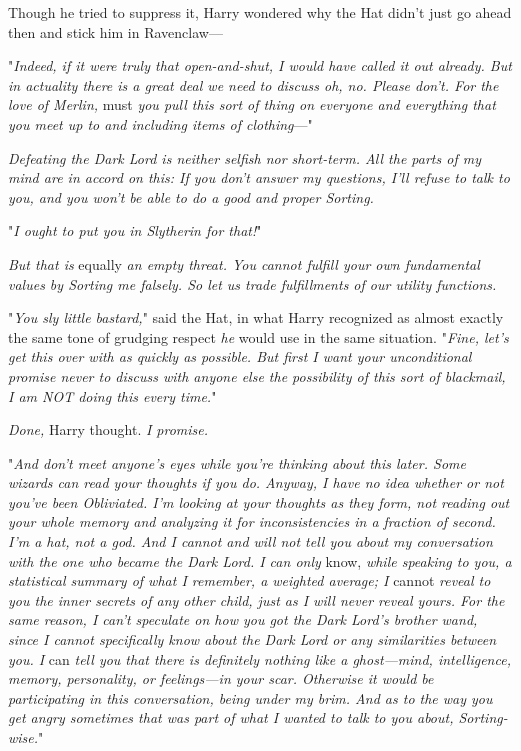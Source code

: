 Though he tried to suppress it, Harry wondered why the Hat didn't just go ahead
then and stick him in Ravenclaw---

"\emph{Indeed, if it were truly that open-and-shut, I would have called it out
already. But in actuality there is a great deal we need to discuss{\el} oh,
no. Please don't. For the love of Merlin,} must \emph{you pull this sort of
thing on everyone and everything that you meet up to and including items of
clothing}\mbox{---}"

\emph{Defeating the Dark Lord is neither selfish nor short-term. All the parts
of my mind are in accord on this: If you don't answer my questions, I'll refuse
to talk to you, and you won't be able to do a good and proper Sorting.}

"\emph{I ought to put you in Slytherin for that!}"

\emph{But that is} equally \emph{an empty threat. You cannot fulfill your own
fundamental values by Sorting me falsely. So let us trade fulfillments of our
utility functions.}

"\emph{You sly little bastard,}" said the Hat, in what Harry recognized as
almost exactly the same tone of grudging respect \emph{he} would use in the
same situation. "\emph{Fine, let's get this over with as quickly as possible.
But first I want your unconditional promise never to discuss with anyone else
the possibility of this sort of blackmail, I am NOT doing this every time.}"

\emph{Done,} Harry thought. \emph{I promise.}

"\emph{And don't meet anyone's eyes while you're thinking about this later.
Some wizards can read your thoughts if you do. Anyway, I have no idea whether
or not you've been Obliviated. I'm looking at your thoughts as they form, not
reading out your whole memory and analyzing it for inconsistencies in a
fraction of second. I'm a hat, not a god. And I cannot and will not tell you
about my conversation with the one who became the Dark Lord. I can only}
know, \emph{while speaking to you, a statistical summary of what I remember, a
weighted average; I} cannot \emph{reveal to you the inner secrets of any other
child, just as I will never reveal yours. For the same reason, I can't
speculate on how you got the Dark Lord's brother wand, since I cannot
specifically know about the Dark Lord or any similarities between you. I}
can \emph{tell you that there is definitely nothing like a ghost---mind,
intelligence, memory, personality, or feelings---in your scar. Otherwise it
would be participating in this conversation, being under my brim. And as to the
way you get angry sometimes{\el} that was part of what I wanted to talk to
you about, Sorting-wise.}"

